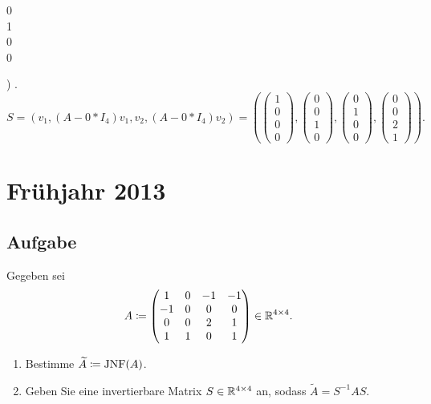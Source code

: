 \begin{enumerate}
\begin{smallmatrix}
			0 \\ 1 \\ 0 \\ 0
		\end{smallmatrix} \right) \).
		\begin{equation*}
			S = \left( v_1, (A - 0*I_4)v_1, v_2, (A-0*I_4)v_2 \right) = \left( \left( \begin{smallmatrix}
			1 \\ 0 \\ 0 \\ 0
		\end{smallmatrix} \right), \left( \begin{smallmatrix}
			0 \\ 0 \\ 1 \\ 0
		\end{smallmatrix} \right), \left( \begin{smallmatrix}
			0 \\ 1 \\ 0 \\ 0
		\end{smallmatrix} \right), \left( \begin{smallmatrix}
			0 \\ 0 \\ 2 \\ 1
		\end{smallmatrix} \right) \right)\text{.}
		\end{equation*}
\end{enumerate}

\newpage

\section{Frühjahr 2013}

\subsection{Aufgabe}
Gegeben sei
\begin{equation*}
	A \coloneqq \begin{pmatrix}
		1 & 0 & -1 & -1 \\
		-1 & 0 & 0 & 0 \\
		0 & 0 & 2 & 1 \\
		1 & 1 & 0 & 1
	\end{pmatrix} \in \mathbb{R}^{4 \times 4}\text{.}
\end{equation*}
\begin{enumerate}
	\item Bestimme \( \widetilde{A} \coloneqq \text{JNF}(A) \).
	\item Geben Sie eine invertierbare Matrix \( S \in \mathbb{R}^{4 \times 4} \) an, sodass \( \widetilde{A} = S^{-1}AS \). 
\end{enumerate}

